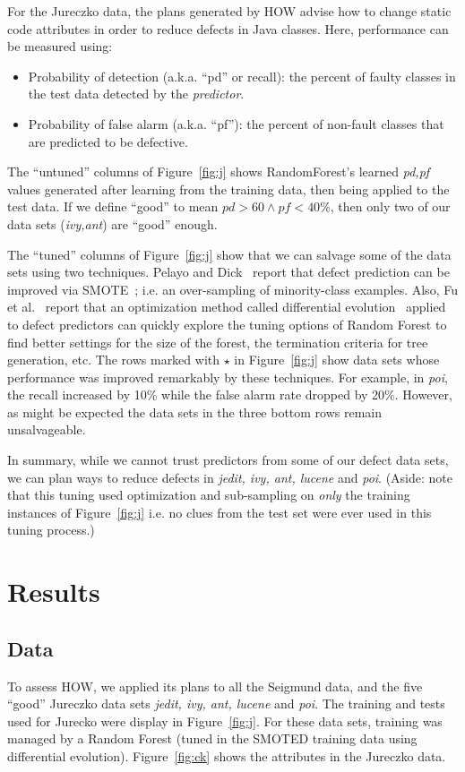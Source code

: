 \documentclass[conference]{IEEEtran}
\newcommand{\bi}{\begin{itemize}}
\newcommand{\ei}{\end{itemize}}
\newcommand{\fig}[1]{Figure~\ref{fig:#1}}
\begin{document}
For the  Jureczko   data,
the plans generated by HOW advise   how to change static code attributes in order to reduce defects in
Java classes.  Here,
performance can be measured using:
\bi
\item Probability of detection (a.k.a. ``pd'' or recall):  the percent of faulty classes in
the test data detected
by the {\em predictor}.
\item Probability of false alarm (a.k.a. ``pf''): the percent of non-fault
classes that are predicted to be defective.
\ei 
The ``untuned'' columns of \fig{j} shows RandomForest's learned {\em pd,pf}
values generated after learning from the training data, then being applied to the test data.
If we define ``good'' to mean $\mathit{pd}>60 \wedge \mathit{pf} < 40$\%,
then only two of our data sets ({\em ivy,ant}) are ``good'' enough. 

The ``tuned'' columns of \fig{j} show that we can salvage some of the data sets
using two techniques.
 Pelayo and Dick~\cite{pelayo07} report that defect prediction can be improved via SMOTE~\cite{Chawla2002}; i.e. an over-sampling of minority-class examples.
 Also, Fu et al.~\cite{fu:ase15} report that an optimization method called differential evolution~\cite{storn97}
applied to defect predictors can quickly explore the tuning
options of Random Forest to find better settings for the size of the forest, the termination criteria
for tree generation, etc.
The rows marked with $\star$ in \fig{j} show data sets whose performance was improved remarkably by these
techniques. For example, in {\em poi}, the recall increased by 10\% while the false alarm rate dropped by 20\%.
However,  as might be expected
the data sets in the  three bottom rows remain
unsalvageable.

In summary, while we cannot trust predictors from some of our defect data sets,
we can plan ways to reduce defects in {\em jedit, ivy, ant, lucene} and {\em poi}.
(Aside: note that this tuning used optimization and sub-sampling   on   {\em only} the
training instances of \fig{j}
i.e.
no clues from the test set were ever used in this tuning process.)


 

\section{Results}

\subsection{Data}
To assess HOW, we applied its plans to all the Seigmund data, and the five ``good''
  Jureczko   data sets {\em jedit, ivy, ant, lucene} and {\em poi}.
  The training and tests used for Jurecko were display in \fig{j}. For these data
  sets, training was managed by a Random Forest (tuned in the SMOTED training data using differential
  evolution). \fig{ck} shows the attributes in the Jureczko data.
  
\end{document}
